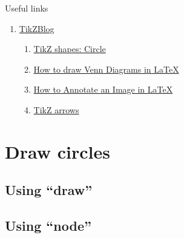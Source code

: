 \documentclass[12pt, letterpaper, oneside]{article}
\begin{document}
Useful links
\begin{enumerate}
  \item \href{https://latexdraw.com/}{TikZBlog}
    \begin{enumerate}
      \item \href{https://latexdraw.com/tikz-shapes-circle/}{TikZ shapes: Circle}
      \item \href{https://latexdraw.com/how-to-draw-venn-diagrams-in-latex/}{How to draw Venn Diagrams in LaTeX}
      \item \href{https://latexdraw.com/how-to-annotate-an-image-in-latex/}{How to Annotate an Image in LaTeX}
      \item \href{https://latexdraw.com/exploring-tikz-arrows/}{TikZ arrows}
    \end{enumerate}
\end{enumerate}

\section{Draw circles}

\subsection{Using ``draw''}


\subsection{Using ``node''}
\end{document}
